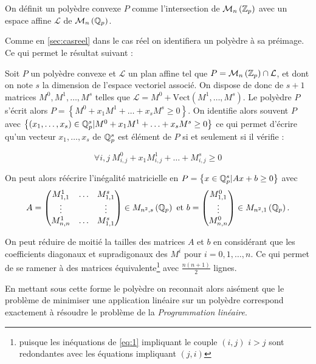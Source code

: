 \begin{definition}
\begin{definition}
On définit un polyèdre convexe $P$ comme l'intersection de $\mathcal{M}_n \left(  \mathbb {Z}_p  \right)$ avec un espace affine $\mathcal{L} $ de $\mathcal{M}_n\left( \mathbb{Q}_p \right) $. 
\end{definition}
Comme en \ref{sec:casreel} dans le cas réel on identifiera un polyèdre à sa préimage. Ce qui permet le résultat suivant :


\iffalse
Soit $P$ un polyèdre convexe et $\mathcal{L} $ un plan affine tel que $P = \mathcal{M}_n \left(  \mathbb {Z}_p  \right) \cap \mathcal{L}$, et dont on note $s$ la dimension de l'espace vectoriel associé. On dispose de donc de $s +1 $ matrices $M^0,M^1,\ldots, M^s$ telles que $\mathcal{L} = M^0 + \text{Vect}\left( M^1,\ldots,M^s \right)$. Le polyèdre $P$ s'écrit alors $P = \left\{ M^0 + x_1 M^1 + \ldots + x_s M^s \ge 0 \right\}$. On identifie alors souvent $P$ avec $\left\{ \left( x_1,\ldots,x_s \right) \in \mathbb{Q}_p^s |M^0 + x_1 M^1 + \ldots + x_s M^s \ge 0 \right\}$ ce qui permet d'écrire qu'un vecteur $x_1,\ldots,x_s$ de $\mathbb{Q}_p^s$ est élément de $P$ si et seulement si il vérifie :
 
	\begin{equation}
	\label{eq:1} 
\forall i,j ~  M^0_{i,j} + x_1 M^1_{i,j} + \ldots + M^s_{i,j} \ge 0
	\end{equation}

On peut alors réécrire l'inégalité matricielle en  $P = \left\{ x \in \mathbb{Q}_p^s \-| Ax + b \ge 0 \right\} $ avec 
\[A = \begin{pmatrix} M^1_{1,1} & \ldots & M^s_{1,1} \\
\vdots & & \vdots \\
M^1_{n,n} & \ldots & M^s_{1,1}\\ \end{pmatrix} \in M_{n^2,s}\left( \mathbb{Q}_p \right) \text{ et } 
b = \begin{pmatrix} M^0_{1,1} \\
\vdots\\
M^0_{n,n} \end{pmatrix} \in M_{n^2, 1}\left( \mathbb{Q}_p \right) 
.\]  
\begin{remarque}
	On peut réduire de moitié la tailles des matrices $A$ et $b$ en considérant que les coefficients diagonaux et supradigonaux des $M^i$ pour $i = 0,1,\ldots,n$. Ce qui permet de se ramener à des matrices équivalente\footnote{puisque les inéquations de \ref{eq:1} impliquant le couple $(i,j)$ $i>j$ sont redondantes avec les équations impliquant $(j,i)$}  avec $\frac{n(n+1)}{2}$ lignes.  
\end{remarque}

En mettant sous cette forme le polyèdre on reconnait alors aisément que le problème de minimiser une application linéaire sur un polyèdre correspond exactement à résoudre le problème de la \textit{Programmation linéaire}.


\end{definition}
